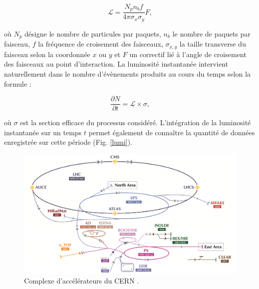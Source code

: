\begin{equation}
    \mathcal{L}=\frac{N_pn_bf}{4\pi\sigma_x\sigma_y}F,
\end{equation}

où $N_p$ désigne le nombre de particules par paquets, $n_b$ le nombre de paquets par faisceau, $f$ la fréquence de croisement des faisceaux, $\sigma_{x,y}$ la taille transverse du faisceau selon la coordonnée $x$ ou $y$ et $F$ un correctif lié à l'angle de croisement des faisceaux au point d'interaction. La luminosité instantanée intervient naturellement dans le nombre d'évènements produits au cours du temps selon la formule : 

\begin{equation}
    \frac{\partial N}{\partial t}=\mathcal{L}\times\sigma,
\end{equation}

où $\sigma$ est la section efficace du processus considéré. L'intégration de la luminosité instantanée sur un temps $t$ permet également de connaître la quantité de données enregistrée sur cette période (Fig. \ref{lumi}).  \\

\begin{figure}
\centering
    \includegraphics[scale=0.18]{Chapitre3/Images/cern-complex.jpg} 
\caption{Complexe d'accélérateurs du CERN \cite{CERNacc}.}
\label{complex}
\end{figure}

